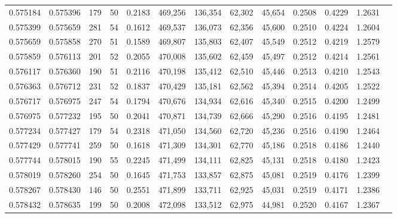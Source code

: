 \begin{tabular}{rrrrrrrrrrrrr}
0.575184 & 0.575396 &   179 &  50 &                                     0.2183 & 469,256 & 136,354 &  62,302 &  45,654 & 0.2508 & 0.4229 & 1.2631 \\
0.575399 & 0.575659 &   281 &  54 &                                     0.1612 & 469,537 & 136,073 &  62,356 &  45,600 & 0.2510 & 0.4224 & 1.2604 \\
0.575659 & 0.575858 &   270 &  51 &                                     0.1589 & 469,807 & 135,803 &  62,407 &  45,549 & 0.2512 & 0.4219 & 1.2579 \\
0.575859 & 0.576113 &   201 &  52 &                                     0.2055 & 470,008 & 135,602 &  62,459 &  45,497 & 0.2512 & 0.4214 & 1.2561 \\
0.576117 & 0.576360 &   190 &  51 &                                     0.2116 & 470,198 & 135,412 &  62,510 &  45,446 & 0.2513 & 0.4210 & 1.2543 \\
0.576363 & 0.576712 &   231 &  52 &                                     0.1837 & 470,429 & 135,181 &  62,562 &  45,394 & 0.2514 & 0.4205 & 1.2522 \\
0.576717 & 0.576975 &   247 &  54 &                                     0.1794 & 470,676 & 134,934 &  62,616 &  45,340 & 0.2515 & 0.4200 & 1.2499 \\
0.576975 & 0.577232 &   195 &  50 &                                     0.2041 & 470,871 & 134,739 &  62,666 &  45,290 & 0.2516 & 0.4195 & 1.2481 \\
0.577234 & 0.577427 &   179 &  54 &                                     0.2318 & 471,050 & 134,560 &  62,720 &  45,236 & 0.2516 & 0.4190 & 1.2464 \\
0.577429 & 0.577741 &   259 &  50 &                                     0.1618 & 471,309 & 134,301 &  62,770 &  45,186 & 0.2518 & 0.4186 & 1.2440 \\
0.577744 & 0.578015 &   190 &  55 &                                     0.2245 & 471,499 & 134,111 &  62,825 &  45,131 & 0.2518 & 0.4180 & 1.2423 \\
0.578019 & 0.578260 &   254 &  50 &                                     0.1645 & 471,753 & 133,857 &  62,875 &  45,081 & 0.2519 & 0.4176 & 1.2399 \\
0.578267 & 0.578430 &   146 &  50 &                                     0.2551 & 471,899 & 133,711 &  62,925 &  45,031 & 0.2519 & 0.4171 & 1.2386 \\
0.578432 & 0.578635 &   199 &  50 &                                     0.2008 & 472,098 & 133,512 &  62,975 &  44,981 & 0.2520 & 0.4167 & 1.2367 \\

\end{tabular}
